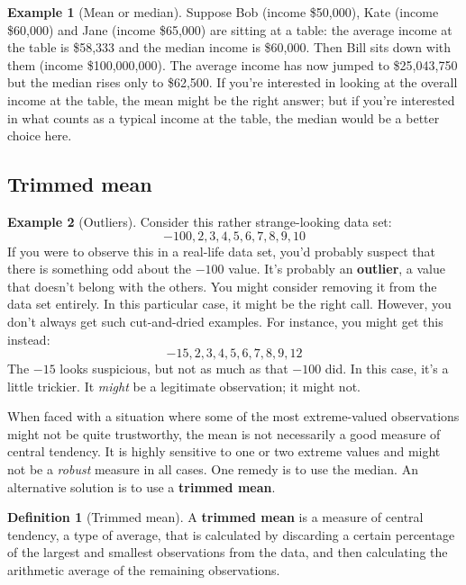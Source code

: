 \documentclass[
  11pt,
]{book}
\theoremstyle{definition}
\newtheorem{definition}{Definition}[chapter]
\theoremstyle{definition}
\newtheorem{example}{Example}[chapter]
\theoremstyle{definition}
\theoremstyle{definition}
\theoremstyle{remark}
\begin{document}
\begin{example}[Mean or median]
\protect\hypertarget{exm:exmeanmedian}{}\label{exm:exmeanmedian}Suppose Bob (income \$50,000), Kate (income \$60,000) and Jane (income \$65,000) are sitting at a table: the average income at the table is \$58,333 and the median income is \$60,000. Then Bill sits down with them (income \$100,000,000). The average income has now jumped to \$25,043,750 but the median rises only to \$62,500. If you're interested in looking at the overall income at the table, the mean might be the right answer; but if you're interested in what counts as a typical income at the table, the median would be a better choice here.
\end{example}

\hypertarget{trimmedmean}{%
\subsection{Trimmed mean}\label{trimmedmean}}

\begin{example}[Outliers]
\protect\hypertarget{exm:exoutliers}{}\label{exm:exoutliers}Consider this rather strange-looking data set:
\[
-100,2,3,4,5,6,7,8,9,10
\]
If you were to observe this in a real-life data set, you'd probably suspect that there is something odd about the \(-100\) value. It's probably an \textbf{outlier}, a value that doesn't belong with the others. You might consider removing it from the data set entirely. In this particular case, it might be the right call. However, you don't always get such cut-and-dried examples. For instance, you might get this instead:
\[
-15,2,3,4,5,6,7,8,9,12
\]
The \(-15\) looks suspicious, but not as much as that \(-100\) did. In this case, it's a little trickier. It \emph{might} be a legitimate observation; it might not.
\end{example}

When faced with a situation where some of the most extreme-valued observations might not be quite trustworthy, the mean is not necessarily a good measure of central tendency. It is highly sensitive to one or two extreme values and might not be a \emph{robust} measure in all cases. One remedy is to use the median. An alternative solution is to use a \textbf{trimmed mean}.

\begin{definition}[Trimmed mean]
\protect\hypertarget{def:deftrimmedmean}{}\label{def:deftrimmedmean}A \textbf{trimmed mean} is a measure of central tendency, a type of average, that is calculated by discarding a certain percentage of the largest and smallest observations from the data, and then calculating the arithmetic average of the remaining observations.
\end{definition}
\end{document}
